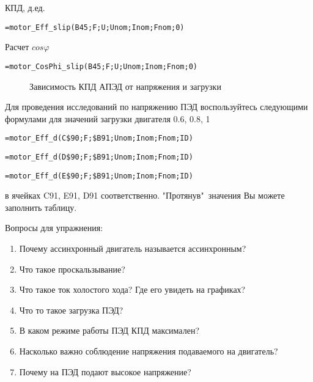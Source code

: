 КПД, д.ед.

{ \small  \texttt{=motor\_Eff\_slip(B45;F;U;Unom;Inom;Fnom;0)}}

Расчет $cos \varphi $

{ \small  \texttt{=motor\_CosPhi\_slip(B45;F;U;Unom;Inom;Fnom;0)}}


\begin{figure}[h!]
	\center{\texttt{[image: Ex80\_3]}}
	\caption{Зависимость КПД АПЭД от напряжения и загрузки}
	\label{ris:Ex80_3}
\end{figure}

Для проведения исследований по напряжению ПЭД воспользуйтесь следующими формулами для значений загрузки двигателя 0.6, 0.8, 1 

{ \small  \texttt{=motor\_Eff\_d(C\$90;F;\$B91;Unom;Inom;Fnom;ID)}}

{ \small  \texttt{=motor\_Eff\_d(D\$90;F;\$B91;Unom;Inom;Fnom;ID)}}

{ \small  \texttt{=motor\_Eff\_d(E\$90;F;\$B91;Unom;Inom;Fnom;ID)}}

в ячейках C91, E91, D91 соответственно. "Протянув"\ значения Вы можете заполнить таблицу.

Вопросы для упражнения:

\begin{enumerate}
	\item Почему ассинхронный двигатель называется ассинхронным?
	\item Что такое проскальзывание?
	\item Что такое ток холостого хода? Где его увидеть на графиках?
	\item Что то такое загрузка ПЭД?
	\item В каком режиме работы ПЭД КПД максимален?
	\item Насколько важно соблюдение напряжения подаваемого на двигатель?
	\item Почему на ПЭД подают высокое напряжение?
\end{enumerate}